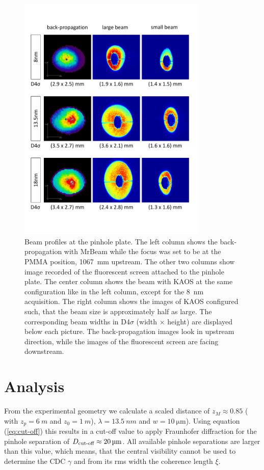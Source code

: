 \documentclass{osa-article}
\begin{document}
\begin{figure}[htbp]
    \centering
    \includegraphics[width=0.8\textwidth]{gfx/beamprofiles.pdf}
    \caption{Beam profiles at the pinhole plate. The left column shows the back-propagation with MrBeam while the focus was set to be at the PMMA position, \SI{1067}{mm} upstream. The other two columns show image recorded of the fluorescent screen attached to the pinhole plate. The center column shows the beam with KAOS at the same configuration like in the left column, except for the \SI{8}{nm} acquisition.  The right column shows the images of KAOS configured such, that the beam size is approximately half as large. The corresponding beam widths in D4$\sigma$ (width $\times$ height) are displayed below each picture. The back-propagation images look in upstream direction, while the images of the fluorescent screen are facing downstream.}
    \label{fig:beamprofiles}
\end{figure}


\section{Analysis}

From the experimental geometry we calculate a scaled distance of $ z_M \approx 0.85 $ ( with $ z_p = \SI{6}{m} $ and $ z_0 = \SI{1}{m} $), $ \lambda = \SI{13.5}{nm} $ and $ w = \SI{10}{\micro\meter} $). Using equation (\ref{eq:cut-off}) this results in a cut-off value to apply Fraunhofer diffraction for the pinhole separation of $ D_\textup{cut-off} \approx \SI{20}{\micro\meter} $. All available pinhole separations are larger than this value, which means, that the central visibility cannot be used to determine the CDC $ \gamma $ and from its rms width the coherence length $\xi$.
\end{document}
